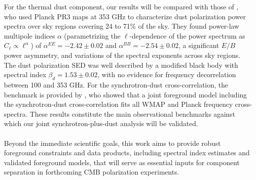 For the thermal dust component, our results will be compared with those of \citet{Planck_2018XI}, who used Planck PR3 maps at 353 GHz to characterize dust polarization power spectra over sky regions covering 24 to 71\% of the sky. They found power-law multipole indices $\alpha$ (parametrizing the $\ell$-dependence of the power spectrum as $C_\ell \propto \ell^\alpha$) of $\alpha^{EE} = -2.42 \pm 0.02$ and $\alpha^{BB} = -2.54 \pm 0.02$, a significant $E/B$ power asymmetry, and variations of the spectral exponents across sky regions. The dust polarization SED was well described by a modified black body with spectral index $\beta_d = 1.53 \pm 0.02$, with no evidence for frequency decorrelation between 100 and 353 GHz. For the synchrotron-dust cross-correlation, the benchmark is provided by \citet{Choi_2015}, who showed that a joint foreground model including the synchrotron-dust cross-correlation fits all WMAP and Planck frequency cross-spectra. These results constitute the main observational benchmarks against which our joint synchrotron-plus-dust analysis will be validated.


\paragraph*{}

Beyond the immediate scientific goals, this work aims to provide robust foreground constraints and data products, including spectral index estimates and validated foreground models, that will serve as essential inputs for component separation in forthcoming CMB polarization experiments. 